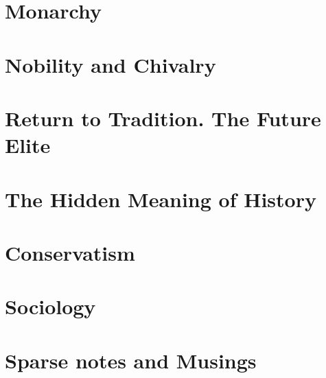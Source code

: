 \documentclass[a4paper,12pt,twoside]{book}
\begin{document}
\chapter{Monarchy}


\chapter{Nobility and Chivalry}








\chapter{Return to Tradition. The Future Elite}






\chapter{The Hidden Meaning of History}





\chapter{Conservatism}





\chapter{Sociology}




\chapter{Sparse notes and Musings}



\end{document}
